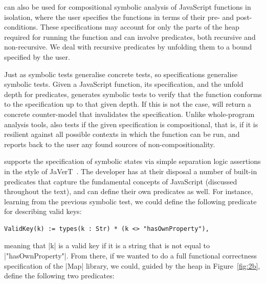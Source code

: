 
\cosette can also be used for compositional symbolic analysis of JavaScript functions in isolation, where the user specifies the functions in terms of their pre- and post-conditions. These specifications may account for only the parts of the heap required for running the function and can involve predicates, both recursive and non-recursive. We deal with recursive predicates by unfolding them to a  bound specified by the user.

Just as symbolic tests generalise concrete tests, so specifications generalise symbolic tests. Given a JavaScript function, its specification, and the unfold depth for predicates, \cosette generates symbolic tests to verify that the function conforms to the specification up to that given depth. If this is not the case, \cosette will return a concrete counter-model that invalidates the specification. Unlike whole-program analysis tools, \cosette also tests if the given specification is compositional, that is, if it is resilient against all possible contexts in which the function can be run, and reports back to the user any found sources of non-compositionality.

\cosette supports the specification of symbolic states via simple separation logic assertions in the style of JaVerT~\cite{javert}. The developer has at their disposal a number of built-in predicates that capture the fundamental concepts of JavaScript (discussed throughout the text), and can define their own predicates as well. For instance, learning from the previous symbolic test, we could define the following predicate for describing valid keys:
\begin{Verbatim}[fontsize=\footnotesize,commandchars=\\\{\}]
    ValidKey(k) := types(k : Str) * (k <> "hasOwnProperty"),
\end{Verbatim}
\noindent meaning that \jsinline|k| is a valid key if it is a string that is not equal to \jsinline|"hasOwnProperty"|. From there, if we wanted to do a full functional correctness specification of the \jsinline|Map| library, we could, guided by the heap in Figure~\ref{fig:2b}, define the following two predicates:

